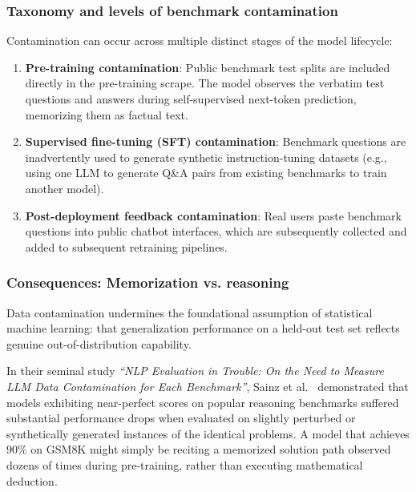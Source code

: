 \documentclass[../../../main.tex]{subfiles}
\begin{document}
\subsubsection{Taxonomy and levels of benchmark contamination}
Contamination can occur across multiple distinct stages of the model lifecycle:
\begin{enumerate}
    \item \textbf{Pre-training contamination}: Public benchmark test splits are included directly in the pre-training scrape. The model observes the verbatim test questions and answers during self-supervised next-token prediction, memorizing them as factual text.
    \item \textbf{Supervised fine-tuning (SFT) contamination}: Benchmark questions are inadvertently used to generate synthetic instruction-tuning datasets (e.g., using one LLM to generate Q\&A pairs from existing benchmarks to train another model).
    \item \textbf{Post-deployment feedback contamination}: Real users paste benchmark questions into public chatbot interfaces, which are subsequently collected and added to subsequent retraining pipelines.
\end{enumerate}

\subsubsection{Consequences: Memorization vs. reasoning}
Data contamination undermines the foundational assumption of statistical machine learning: that generalization performance on a held-out test set reflects genuine out-of-distribution capability.

In their seminal study \textit{``NLP Evaluation in Trouble: On the Need to Measure LLM Data Contamination for Each Benchmark''}, Sainz et al.~\cite{sainz2023contamination} demonstrated that models exhibiting near-perfect scores on popular reasoning benchmarks suffered substantial performance drops when evaluated on slightly perturbed or synthetically generated instances of the identical problems. A model that achieves $90\%$ on GSM8K might simply be reciting a memorized solution path observed dozens of times during pre-training, rather than executing mathematical deduction.
\end{document}

